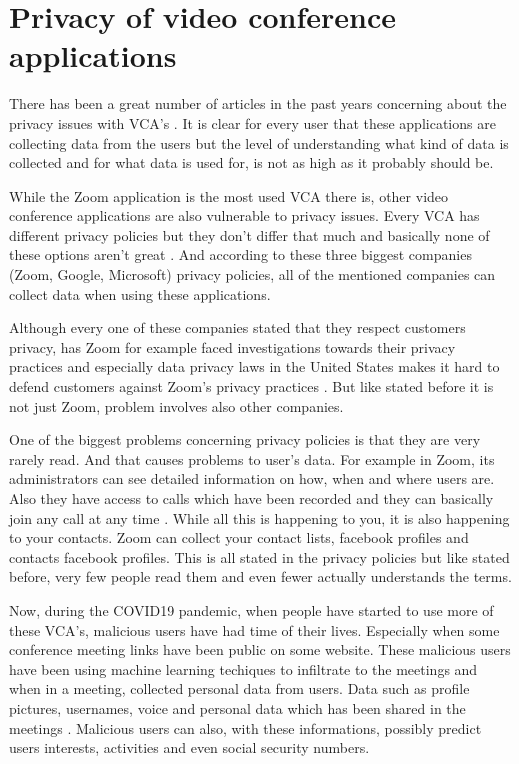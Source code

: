 \documentclass[utf8,english]{gradu3}
\begin{document}
\section{Privacy of video conference applications}
There has been a great number of articles in the past years concerning about the privacy issues with VCA's \parencite{vcadata}. It is clear for every user that these applications are collecting data from the users but the level of understanding what kind of data is collected and for what data is used for, is not as high as it probably should be.

While the Zoom application is the most used VCA there is, other video conference applications are also vulnerable to privacy issues. Every VCA has different privacy policies but they don't differ that much and basically none of these options aren't great \parencite{ZoomGoogleMS}. And according to these three biggest companies (Zoom, Google, Microsoft) privacy policies, all of the mentioned companies can collect data when using these applications. 

Although every one of these companies stated that they respect customers privacy, has Zoom for example faced investigations towards their privacy practices and especially data privacy laws in the United States makes it hard to defend customers against Zoom's privacy practices \parencite{Darkside}. But like stated before it is not just Zoom, problem involves also other companies.

One of the biggest problems concerning privacy policies is that they are very rarely read. And that causes problems to user's data. For example in Zoom, its administrators can see detailed information on how, when and where users are. Also they have access to calls which have been recorded and they can basically join any call at any time \parencite{Darkside}.
%
While all this is happening to you, it is also happening to your contacts. Zoom can collect your contact lists, facebook profiles and contacts facebook profiles. This is all stated in the privacy policies but like stated before, very few people read them and even fewer actually understands the terms.

Now, during the COVID19 pandemic, when people have started to use more of these VCA's, malicious users have had time of their lives. Especially when some conference meeting links have been public on some website. These malicious users have been using machine learning techiques to infiltrate to the meetings and when in a meeting, collected personal data from users. Data such as profile pictures, usernames, voice and personal data which has been shared in the meetings \parencite{zoomingInto}.
Malicious users can also, with these informations, possibly predict users interests, activities and even social security numbers.
\end{document}
